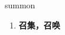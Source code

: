 
\begin{frame}
{\huge summon}
\begin{center}
\begin{enumerate}\Large
  \item \textbf{召集，召唤}
\end{enumerate}
\end{center}
\end{frame}
